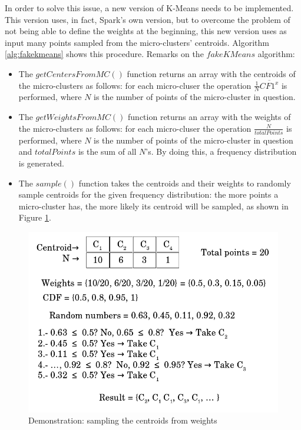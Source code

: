 \documentclass[10pt, conference, compsocconf]{IEEEtran}
\begin{document}
In order to solve this issue, a new version of K-Means needs to be implemented. This version uses, in fact, Spark's own version, but to overcome the problem of not being able to define the weights at the beginning, this new version uses as input many points sampled from the micro-clusters' centroids. Algorithm \ref{alg:fakekmeans} shows this procedure.
Remarks on the $fakeKMeans$ algorithm:

\begin{itemize}
 \item The $getCentersFromMC()$ function returns an array with the centroids of the micro-clusters as follows: for each micro-cluser the operation $\frac{1}{N}\overline{CF1^x}$ is performed, where $N$ is the number of points of the micro-cluster in question.
 \item The $getWeightsFromMC()$ function returns an array with the weights of the micro-clusters as follows: for each micro-cluser the operation $\frac{N}{totalPoints}$ is performed, where $N$ is the number of points of the micro-cluster in question and $totalPoints$ is the sum of all $N$'s. By doing this, a frequency distribution is generated.
 \item The $sample()$ function takes the centroids and their weights to randomly sample centroids for the given frequency distribution: the more points a micro-cluster has, the more likely its centroid will be sampled, as shown in Figure \ref{fig:sampling}.
\end{itemize}

\begin{figure}[h!]
 \centering
 \includegraphics[scale=0.4]{./styles/sampling.png}
 \caption{Demonstration: sampling the centroids from weights}
 \label{fig:sampling}
\end{figure}
\end{document}
